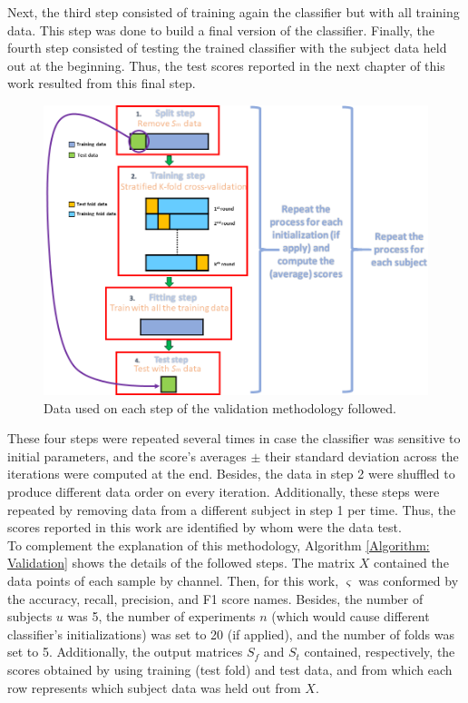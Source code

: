 Next, the third step consisted of training again the classifier but with all training data. This step was done to build a final version of the classifier. Finally, the fourth step consisted of testing the trained classifier with the subject data held out at the beginning. Thus, the test scores reported in the next chapter of this work resulted from this final step.\\

\begin{figure}[h!]
	\includegraphics[width=\linewidth]{Figures/Validation.png}
	\centering
	\caption{Data used on each step of the validation methodology followed.}
	\label{Fig: Validation}
\end{figure}

These four steps were repeated several times in case the classifier was sensitive to initial parameters, and the score's averages $\pm$ their standard deviation across the iterations were computed at the end. Besides, the data in step 2 were shuffled to produce different data order on every iteration. Additionally, these steps were repeated by removing data from a different subject in step 1 per time. Thus, the scores reported in this work are identified by whom were the data test.\\

To complement the explanation of this methodology, Algorithm \ref{Algorithm: Validation} shows the details of the followed steps. The matrix $X$ contained the data points of each sample by channel. Then, for this work, $\varsigma$ was conformed by the accuracy, recall, precision, and F1 score names. Besides, the number of subjects $u$ was 5, the number of experiments $n$ (which would cause different classifier's initializations) was set to 20 (if applied), and the number of folds was set to 5. Additionally, the output matrices $S_{f}$ and $S_{t}$ contained, respectively, the scores obtained by using training (test fold) and test data, and from which each row represents which subject data was held out from $X$.\\

